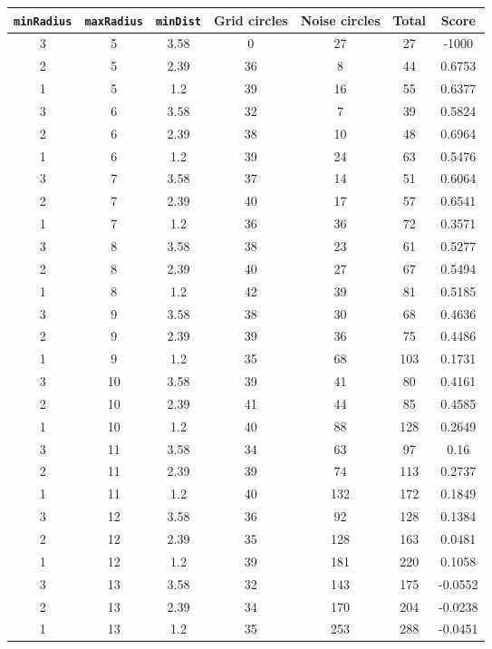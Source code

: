 \documentclass[letterpaper, 12pt]{article}
\begin{document}
\begin{longtable}{|c|c|c|c|c|c|c|}
\hline
\textbf{\texttt{minRadius}} & \textbf{\texttt{maxRadius}} & \textbf{\texttt{minDist}} & \textbf{Grid circles} & \textbf{Noise circles} & \textbf{Total} & \textbf{Score} \\
\hline
3 & 5 & 3.58 & 0 & 27 & 27 & -1000 \\
\hline
2 & 5 & 2.39 & 36 & 8 & 44 & 0.6753 \\
\hline
1 & 5 & 1.2 & 39 & 16 & 55 & 0.6377 \\
\hline
3 & 6 & 3.58 & 32 & 7 & 39 & 0.5824 \\
\hline
2 & 6 & 2.39 & 38 & 10 & 48 & 0.6964 \\
\hline
1 & 6 & 1.2 & 39 & 24 & 63 & 0.5476 \\
\hline
3 & 7 & 3.58 & 37 & 14 & 51 & 0.6064 \\
\hline
2 & 7 & 2.39 & 40 & 17 & 57 & 0.6541 \\
\hline
1 & 7 & 1.2 & 36 & 36 & 72 & 0.3571 \\
\hline
3 & 8 & 3.58 & 38 & 23 & 61 & 0.5277 \\
\hline
2 & 8 & 2.39 & 40 & 27 & 67 & 0.5494 \\
\hline
1 & 8 & 1.2 & 42 & 39 & 81 & 0.5185 \\
\hline
3 & 9 & 3.58 & 38 & 30 & 68 & 0.4636 \\
\hline
2 & 9 & 2.39 & 39 & 36 & 75 & 0.4486 \\
\hline
1 & 9 & 1.2 & 35 & 68 & 103 & 0.1731 \\
\hline
3 & 10 & 3.58 & 39 & 41 & 80 & 0.4161 \\
\hline
2 & 10 & 2.39 & 41 & 44 & 85 & 0.4585 \\
\hline
1 & 10 & 1.2 & 40 & 88 & 128 & 0.2649 \\
\hline
3 & 11 & 3.58 & 34 & 63 & 97 & 0.16 \\
\hline
2 & 11 & 2.39 & 39 & 74 & 113 & 0.2737 \\
\hline
1 & 11 & 1.2 & 40 & 132 & 172 & 0.1849 \\
\hline
3 & 12 & 3.58 & 36 & 92 & 128 & 0.1384 \\
\hline
2 & 12 & 2.39 & 35 & 128 & 163 & 0.0481 \\
\hline
1 & 12 & 1.2 & 39 & 181 & 220 & 0.1058 \\
\hline
3 & 13 & 3.58 & 32 & 143 & 175 & -0.0552 \\
\hline
2 & 13 & 2.39 & 34 & 170 & 204 & -0.0238 \\
\hline
1 & 13 & 1.2 & 35 & 253 & 288 & -0.0451 \\

\end{longtable}
\end{document}
